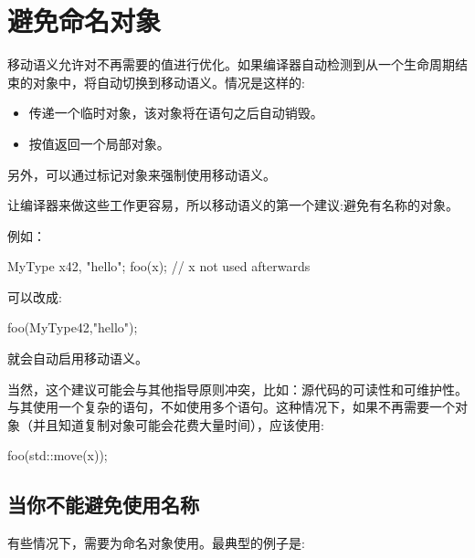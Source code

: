 \section{避免命名对象}
移动语义允许对不再需要的值进行优化。如果编译器自动检测到从一个生命周期结束的对象中，将自动切换到移动语义。情况是这样的:

\begin{itemize}
	\item 传递一个临时对象，该对象将在语句之后自动销毁。
	\item 按值返回一个局部对象。
\end{itemize}

另外，可以通过标记对象来强制使用移动语义。

让编译器来做这些工作更容易，所以移动语义的第一个建议:避免有名称的对象。

例如：

\begin{cppcode}
MyType x{42, "hello"};
foo(x); // x not used afterwards
\end{cppcode}

可以改成:

\begin{cppcode}
foo(MyType{42,"hello"});
\end{cppcode}

就会自动启用移动语义。

当然，这个建议可能会与其他指导原则冲突，比如：源代码的可读性和可维护性。与其使用一个复杂的语句，不如使用多个语句。这种情况下，如果不再需要一个对象（并且知道复制对象可能会花费大量时间），应该使用:

\begin{cppcode}
foo(std::move(x));
\end{cppcode}

\subsection{当你不能避免使用名称}

有些情况下，需要为命名对象使用。最典型的例子是:

